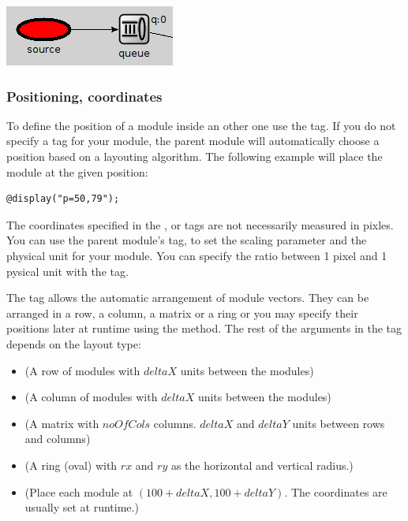 \begin{center}
\includegraphics{figures/graphics-btag}
\end{center}

\subsubsection{Positioning, coordinates}

To define the position of a module inside an other one use the  tag.
If you do not specify a  tag for your module, the parent module will
automatically choose a position based on a layouting algorithm.
The following example will place the module at the given position:
\begin{verbatim}
@display("p=50,79");
\end{verbatim}

\begin{note}
The coordinates specified in the ,  or  tags are not necessarily
measured in pixles. You can use the parent module's  tag, 
to set the scaling parameter and the physical unit for your module. 
You can specify the ratio between 1 pixel and 1 pysical unit with the  tag.
\end{note}

The  tag allows the automatic arrangement of module vectors. They can be
arranged in a row, a column, a matrix or a ring or you may specify their positions
later at runtime using the  method. The rest of the arguments
in the  tag depends on the layout type:

\begin{itemize}
  \item {} (A row of modules with $deltaX$ units between the modules)
  \item {} (A column of modules with $deltaX$ units between the modules)
  \item {} (A matrix with $noOfCols$ columns. 
            $deltaX$ and $deltaY$ units between rows and columns)
  \item {} (A ring (oval) with $rx$ and $ry$ as the horizontal and vertical radius.)
  \item {} (Place each module at $(100+deltaX, 100+deltaY)$. 
            The coordinates are usually set at runtime.)
\end{itemize}

